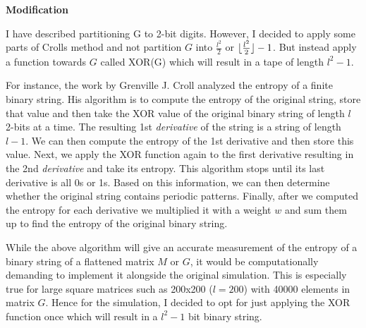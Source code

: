\textbf{\large{Modification}} \par

\vspace{0.3cm}
 I have described partitioning G to 2-bit digits. However, I decided to apply some parts of Crolls method \cite{Grenville_J_Croll:2013} and not partition $G$ into $\frac{l^{2}}{2}$ or $ \lfloor\frac{l^{2}}{2}\rfloor-1$. But instead apply a function towards $G$ called XOR(G) which will result in a tape of length $l^{2}-1$. \par
 
 \vspace{0.3cm}
 For instance, the work by Grenville J. Croll \cite{Grenville_J_Croll:2013} analyzed the entropy of a finite binary string. His algorithm is to compute the entropy of the original string, store that value and then take the XOR value of the original binary string of length $l$ 2-bits at a time. The resulting 1st \emph{derivative} of the string is a string of length $l-1$. We can then compute the entropy of the 1st derivative and then store this value. Next, we apply the XOR function again to the first derivative resulting in the 2nd \emph{derivative} and take its entropy. This algorithm stops until its last derivative is all 0s or 1s. Based on this information, we can then determine whether the original string contains periodic patterns. Finally, after we computed the entropy for each derivative we multiplied it with a weight $w$ and sum them up to find the entropy of the original binary string. \par

 \vspace{0.3cm}
 While the above algorithm will give an accurate measurement of the entropy of a binary string of a flattened matrix $M$ or $G$, it would be computationally demanding to implement it alongside the original simulation. This is especially true for large square matrices such as 200x200 ($l=200$) with 40000 elements in matrix $G$. Hence for the simulation, I decided to opt for just applying the XOR function once which will result in a $l^2-1$ bit binary string. \par

